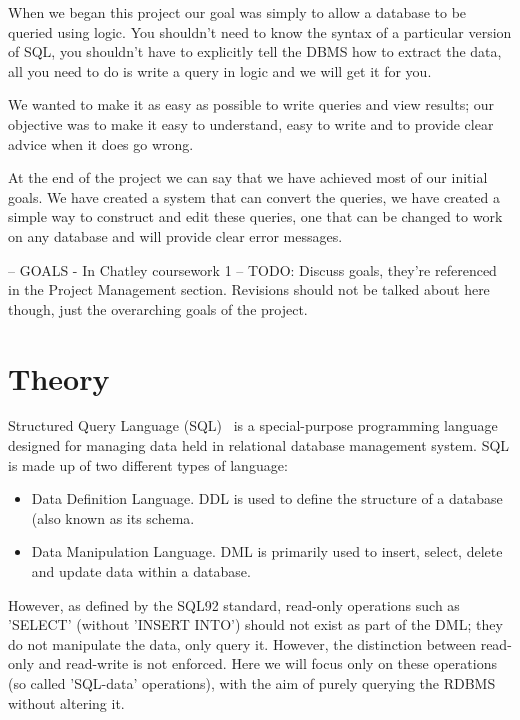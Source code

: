 \documentclass[a4paper, 11pt]{article}
\begin{document}
When we began this project our goal was simply to allow a database to be 
queried using logic. You shouldn't need to know the syntax of a particular
version of SQL, you shouldn't have to explicitly tell the DBMS how to extract
the data, all you need to do is write a query in logic and we will
get it for you.

We wanted to make it as easy as possible to write queries and view results;
our objective was to make it easy to understand, easy to write and to
provide clear advice when it does go wrong.

At the end of the project we can say that we have achieved most of our initial 
goals. We have created a system that can convert the queries, we have created
a simple way to construct and edit these queries, one that can be changed to 
work on any database and will provide clear error messages.

  -- GOALS - In Chatley coursework 1 --
  TODO: Discuss goals, they're referenced in the Project Management
  section. Revisions should not be talked about here though, just the
  overarching goals of the project.

\section{Theory}

  Structured Query Language (SQL)~\cite{wiki:SQL} is a special-purpose
  programming language designed for managing data held in relational database
  management system. SQL is made up of two different types of language:

  \begin{itemize}
      \item
        Data Definition Language. DDL is used to define the structure of a
        database (also known as its schema.
      \item
        Data Manipulation Language. DML is primarily used to insert, select,
        delete and update data within a database.
  \end{itemize}

  However, as defined by the SQL92 standard\cite{isoSQL}, read-only operations
  such as 'SELECT' (without 'INSERT INTO') should not exist as part of the DML;
  they do not manipulate the data, only query it. However, the distinction
  between read-only and read-write is not enforced. Here we will focus only on
  these operations (so called 'SQL-data' operations), with the aim of purely
  querying the RDBMS without altering it.
\end{document}
